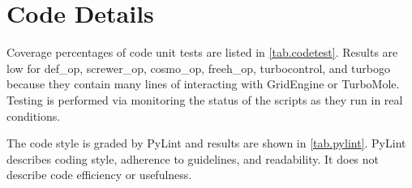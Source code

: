 \section{Code Details}\label{sec.code}

Coverage percentages of code unit tests are listed in \autoref{tab.codetest}. Results are low for def\_op, screwer\_op, cosmo\_op, freeh\_op, turbocontrol, and turbogo because they contain many lines of interacting with GridEngine or TurboMole. Testing is performed via monitoring the status of the scripts as they run in real conditions.

The code style is graded by PyLint and results are shown in \autoref{tab.pylint}. PyLint describes coding style, adherence to guidelines, and readability. It does not describe code efficiency or usefulness.

